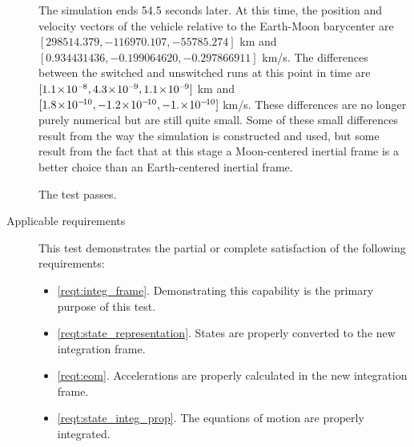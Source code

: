 \begin{description}
The simulation ends 54.5 seconds later. At this time,
the position and velocity vectors of
the vehicle relative to the Earth-Moon barycenter are
$[298514.379, -116970.107, -55785.274]$ km and
$[0.934431436, -0.199064620, -0.297866911]$ km/s.
The differences between the switched and unswitched runs at this point
in time are
$[1.1\eneg{8}, 4.3\eneg{9}, 1.1\eneg{9}]$ km and
$[1.8\eneg{10}, -1.2\eneg{10}, -1.\eneg{10}]$ km/s.
These differences are no longer purely numerical but are still quite small.
Some of these small differences result from
the way the simulation is constructed and used,
but some result from the fact that at this stage a Moon-centered inertial
frame is a better choice than an Earth-centered inertial frame.

The test passes.

\item[Applicable requirements]
This test demonstrates the partial or complete satisfaction of the
following requirements:
\begin{itemize}
\item \ref{reqt:integ_frame}. Demonstrating this capability
is the primary purpose of this test.
\item \ref{reqt:state_representation}. States are properly converted to
the new integration frame.
\item \ref{reqt:eom}. Accelerations are properly calculated
in the new integration frame.
\item \ref{reqt:state_integ_prop}. The equations of motion are properly
integrated.
\end{itemize}

\end{description}
